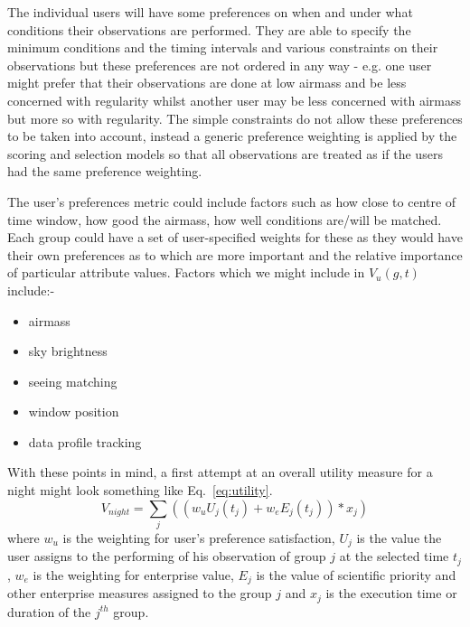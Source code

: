 \begin{itemize}
The individual users will have some preferences on when and under what conditions their observations are performed. They are able to specify the minimum conditions and the timing intervals and various constraints on their observations but these preferences are not ordered in any way - e.g. one user might prefer that their observations are done at low airmass and be less concerned with regularity whilst another user may be less concerned with airmass but more so with regularity. The simple constraints do not allow these preferences to be taken into account, instead a generic preference weighting is applied by the scoring and selection models so that all observations are treated as if the users had the same preference weighting. 

The user's preferences metric could include factors such as how close to centre of time window, how good the airmass, how well conditions are/will be matched. Each group could have a set of user-specified weights for these as they would have their own preferences as to which are more important and the relative importance of particular attribute values. Factors which we might include in $V_u(g,t)$ include:-
\begin{itemize}
\item airmass 
\item sky brightness
\item seeing matching
\item window position
\item data profile tracking
\end{itemize}

\end{itemize}



With these points in mind, a first attempt at an overall utility measure for a night might look something like Eq.~\ref{eq:utility}.
\begin{equation}
\label{eq:utility}
V_{night} = \sum_j ((w_{u}U_j(t_j) + w_{e}E_j(t_j))*x_j) 
\end{equation} 
where $w_{u}$ is the weighting for user's preference satisfaction, $U_j$ is the value the user assigns to the performing of his observation of group $j$ at the selected time $t_j$, $w_{e}$ is the weighting for enterprise value, $E_j$ is the value of scientific priority and other enterprise measures assigned to the group $j$ and $x_j$ is the execution time or duration of the $j^{th}$ group.

